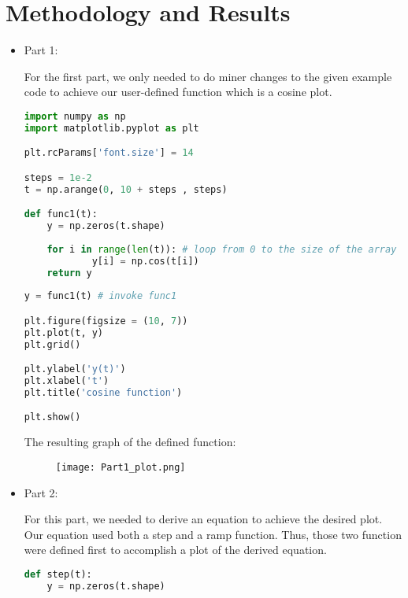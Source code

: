 \documentclass[12pt,a4paper]{article}
\begin{document}
\section{Methodology and Results}\label{sec:meth}
\begin{itemize}
    \item
    Part 1:
    
    For the first part, we only needed to do miner changes to the given example code to achieve our user-defined function which is a cosine plot. 
    
\begin{lstlisting}[language=Python, caption={User-defined function}, label={lst:code}, mathescape=true, breaklines=true]
import numpy as np
import matplotlib.pyplot as plt

plt.rcParams['font.size'] = 14 

steps = 1e-2
t = np.arange(0, 10 + steps , steps)

def func1(t): 
    y = np.zeros(t.shape) 
    
    for i in range(len(t)): # loop from 0 to the size of the array
            y[i] = np.cos(t[i])
    return y
    
y = func1(t) # invoke func1

plt.figure(figsize = (10, 7))
plt.plot(t, y)
plt.grid()

plt.ylabel('y(t)')
plt.xlabel('t')
plt.title('cosine function')

plt.show()
\end{lstlisting}
\clearpage

    The resulting graph of the defined function:\\
\begin{figure}[h]
    \centering
    \texttt{[image: Part1\_plot.png]}
\end{figure}
    \item
    Part 2:
    
    For this part, we needed to derive an equation to achieve the desired plot. Our equation used both a step and a ramp function. Thus, those two function were defined first to accomplish a plot of the derived equation.

\begin{lstlisting}[language=Python, caption={Step function}, label={lst:code}, mathescape=true, breaklines=true]
def step(t):
    y = np.zeros(t.shape)
    

\end{lstlisting}
\end{itemize}
\end{document}
